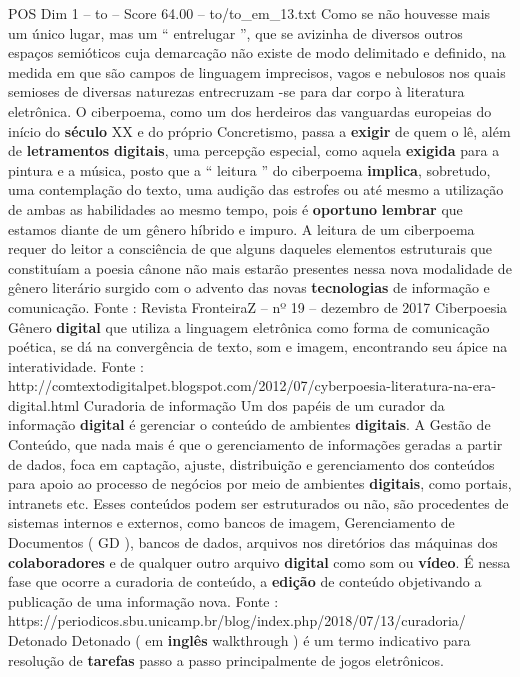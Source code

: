 \begin{textsample}{POS Dim 1 – to – Score 64.00 – to/to\_em\_13.txt}
Como se não houvesse mais um único lugar, mas um “ entrelugar ”, que se avizinha de diversos outros espaços semióticos cuja demarcação não existe de modo delimitado e definido, na medida em que são campos de linguagem imprecisos, vagos e nebulosos nos quais semioses de diversas naturezas entrecruzam -se para dar corpo à literatura eletrônica.
O ciberpoema, como um dos herdeiros das vanguardas europeias do início do \textbf{século} XX e do próprio Concretismo, passa a \textbf{exigir} de quem o lê, além de \textbf{letramentos} \textbf{digitais}, uma percepção especial, como aquela \textbf{exigida} para a pintura e a música, posto que a “ leitura ” do ciberpoema \textbf{implica}, sobretudo, uma contemplação do texto, uma audição das estrofes ou até mesmo a utilização de ambas as habilidades ao mesmo tempo, pois é \textbf{oportuno} \textbf{lembrar} que estamos diante de um gênero híbrido e impuro.
A leitura de um ciberpoema requer do leitor a consciência de que alguns daqueles elementos estruturais que constituíam a poesia cânone não mais estarão presentes nessa nova modalidade de gênero literário surgido com o advento das novas \textbf{tecnologias} de informação e comunicação.
Fonte : Revista FronteiraZ – nº 19 – dezembro de 2017 Ciberpoesia Gênero \textbf{digital} que utiliza a linguagem eletrônica como forma de comunicação poética, se dá na convergência de texto, som e imagem, encontrando seu ápice na interatividade.
Fonte : http://comtextodigitalpet.blogspot.com/2012/07/cyberpoesia-literatura-na-era-digital.html Curadoria de informação Um dos papéis de um curador da informação \textbf{digital} é gerenciar o conteúdo de ambientes \textbf{digitais}.
A Gestão de Conteúdo, que nada mais é que o gerenciamento de informações geradas a partir de dados, foca em captação, ajuste, distribuição e gerenciamento dos conteúdos para apoio ao processo de negócios por meio de ambientes \textbf{digitais}, como portais, intranets etc.
Esses conteúdos podem ser estruturados ou não, são procedentes de sistemas internos e externos, como bancos de imagem, Gerenciamento de Documentos ( GD ), bancos de dados, arquivos nos diretórios das máquinas dos \textbf{colaboradores} e de qualquer outro arquivo \textbf{digital} como som ou \textbf{vídeo}.
É nessa fase que ocorre a curadoria de conteúdo, a \textbf{edição} de conteúdo objetivando a publicação de uma informação nova.
Fonte : https://periodicos.sbu.unicamp.br/blog/index.php/2018/07/13/curadoria/ Detonado Detonado ( em \textbf{inglês} walkthrough ) é um termo indicativo para resolução de \textbf{tarefas} passo a passo principalmente de jogos eletrônicos.

\end{textsample}
